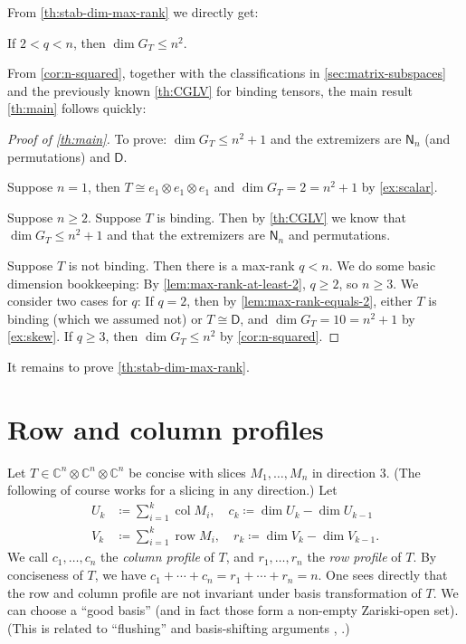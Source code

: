 \documentclass[11pt,a4paper]{article}
\numberwithin{equation}{section}
\newcommand{\CC}{\mathbb{C}}
\DeclareMathOperator{\col}{col}
\DeclareMathOperator{\row}{row}
\begin{document}
From \cref{th:stab-dim-max-rank} we directly get:

\begin{corollary}\label{cor:n-squared}
	If $2 < q < n$, then $\dim G_T \leq n^2$.
\end{corollary}

From \cref{cor:n-squared}, together with the classifications in \cref{sec:matrix-subspaces} and the previously known \cref{th:CGLV} for binding tensors, the main result \cref{th:main} follows quickly:

\begin{proof}[Proof of \cref{th:main}]
To prove: $\dim G_T \leq n^2 + 1$ and the extremizers are $\mathsf{N}_n$ (and permutations) and $\mathsf{D}$.

Suppose $n=1$, then $T \cong e_1 \otimes e_1 \otimes e_1$ and $\dim G_T = 2 = n^2 + 1$ by \cref{ex:scalar}.

Suppose $n \geq 2$. Suppose $T$ is binding. Then by \cref{th:CGLV} we know that $\dim G_T \leq n^2 + 1$ and that the extremizers are $\mathsf{N}_n$ and permutations.

Suppose $T$ is not binding. Then there is a max-rank $q < n$. We do some basic dimension bookkeeping: By \cref{lem:max-rank-at-least-2}, $q \geq 2$, so $n \geq 3$. We consider two cases for $q$:
%
If $q = 2$, then by \cref{lem:max-rank-equals-2}, either $T$ is binding (which we assumed not) or $T \cong \mathsf{D}$, and $\dim G_T = 10 = n^2 + 1$ by \cref{ex:skew}.
%
If $q \geq 3$, then $\dim G_T \leq n^2$ by \cref{cor:n-squared}. 
\end{proof}

It remains to prove \cref{th:stab-dim-max-rank}.

\section{Row and column profiles}\label{sec:profiles}

Let $T \in \CC^n \otimes \CC^n \otimes \CC^n$ be concise with slices $M_1, \ldots, M_n$ in direction 3. (The following of course works for a slicing in any direction.) Let
\begin{align*}
U_k &\coloneqq \sum_{i=1}^k \col M_i,\quad c_k \coloneqq \dim U_k - \dim U_{k-1}\\
V_k &\coloneqq \sum_{i=1}^k \row M_i,\quad r_k \coloneqq \dim V_k - \dim V_{k-1}.
\end{align*}
We call $c_1, \ldots, c_n$ the \emph{column profile} of $T$, and $r_1, \ldots, r_n$ the \emph{row profile} of $T$. By conciseness of $T$, we have $c_1 + \cdots + c_n = r_1 + \cdots + r_n = n$. One sees directly that the row and column profile are not invariant under basis transformation of $T$. We can choose a ``good basis'' (and in fact those form a non-empty Zariski-open set). (This is related to ``flushing'' and basis-shifting arguments \cite[Lemma~2.4]{MR4965400}, \cite{MR5059810}.)
\end{document}
